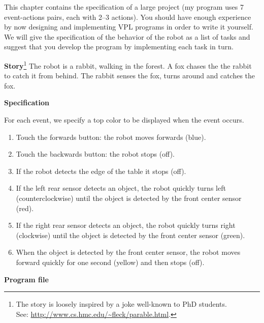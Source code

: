 
\label{ch.rabbit}

This chapter contains the specification of a large project (my program
uses 7 event-actions pairs, each with 2--3 actions). You should have
enough experience by now designing and implementing VPL programs in
order to write it yourself. We will give the specification of the
behavior of the robot as a list of tasks and suggest that you develop
the program by implementing each task in turn.


\textbf{Story}\footnote{The story is loosely inspired by a joke
well-known to PhD students.\\ See:
\url{http://www.cs.hmc.edu/~fleck/parable.html}.} The robot is a rabbit,
walking in the forest. A fox chases the the rabbit to catch
it from behind. The rabbit senses the fox, turns around and catches the
fox.


\textbf{Specification}

For each event, we specify a top color to be displayed when the event occurs.

\begin{enumerate}
\item Touch the forwards button: the robot moves forwards (blue).
\item Touch the backwards button: the robot stops (off).
\item If the robot detects the edge of the table it stops (off).
\item If the left rear sensor detects an object, the robot quickly turns
left (counterclockwise) until the object is detected by the front center
sensor (red).
\item If the right rear sensor detects an object, the robot quickly turns
right (clockwise) until the object is detected by the front center
sensor (green).
\item When the object is detected by the front center sensor, the robot
moves forward quickly for one second (yellow) and then stops (off).
\end{enumerate}

{\raggedleft \hfill \textbf{Program file} }
